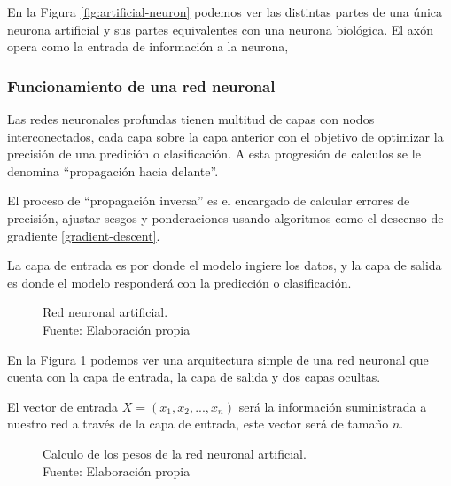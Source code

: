 En la Figura \ref{fig:artificial-neuron} podemos ver las distintas partes de una única neurona artificial y sus partes equivalentes con una neurona biológica. El axón opera como la entrada de información a la neurona,





\subsubsection{Funcionamiento de una red neuronal \label{neural-network}}

Las redes neuronales profundas tienen multitud de capas con nodos interconectados, cada capa sobre la capa anterior con el objetivo de optimizar la precisión de una predición o clasificación. A esta progresión de calculos se le denomina ``propagación hacia delante''.

El proceso de ``propagación inversa'' es el encargado de calcular errores de precisión, ajustar sesgos y ponderaciones usando algoritmos como el descenso de gradiente \ref{gradient-descent}.

La capa de entrada es por donde el modelo ingiere los datos, y la capa de salida es donde el modelo responderá con la predicción o clasificación.

\begin{figure}[H]
    \centering
    \centerline{}
    \caption{Red neuronal artificial.\\Fuente: Elaboración propia}
    \label{fig:artificial-neuronal-network}
\end{figure}

En la Figura \ref{fig:artificial-neuronal-network} podemos ver una arquitectura simple de una red neuronal que cuenta con la capa de entrada, la capa de salida y dos capas ocultas.

El vector de entrada $X = (x_{1}, x_{2}, ..., x_{n})$ será la información suministrada a nuestro red a través de la capa de entrada, este vector será de tamaño $n$.


\begin{figure}[H]
    \centering
    \centerline{}
    \caption{Calculo de los pesos de la red neuronal artificial.\\Fuente: Elaboración propia}
    \label{fig:notation}
\end{figure}

